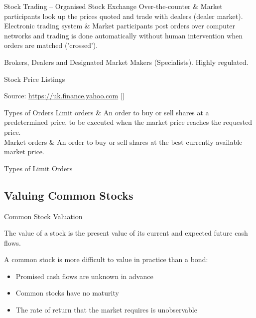 \documentclass[9pt,aspectratio=169]{beamer}
\makeatletter
\newcommand{\keypoint}[1]{%
  \par\noindent
  \begingroup
  \usebeamercolor{keypoint}%
  \setlength{\fboxsep}{7pt}%
  \colorbox{bg}{\parbox{\dimexpr\linewidth-2\fboxsep\relax}{\color{fg}#1}}%
  \endgroup
  \par\medskip}
\newenvironment{terms}{%
  \renewcommand{\arraystretch}{1.35}%
  \tabularx{\linewidth}{@{}>{\bfseries\raggedright\arraybackslash}p{0.30\linewidth} X@{}}
  \toprule}
  {\bottomrule\endtabularx}
\makeatother
\begin{document}
\begin{frame}{Stock Trading – Organised Stock Exchange}
\vspace{0.4em}
\begin{terms}
Over-the-counter & Market participants look up the prices quoted and trade with dealers
  (dealer market). \\
Electronic trading system & Market participants post orders over computer networks and
  trading is done automatically without human intervention when orders are matched
  ('crossed'). \\
\end{terms}

\vspace{0.8em}
Brokers, Dealers and Designated Market Makers (Specialists). Highly regulated.
\end{frame}


\begin{frame}{Stock Price Listings}
\begin{center}


\vspace{0.3cm}
\tiny{Source: \url{https://uk.finance.yahoo.com} [\LHonAsOf]}
\end{center}
\end{frame}


\begin{frame}{Types of Orders}
\vspace{0.5em}
\begin{terms}
Limit orders & An order to buy or sell shares at a predetermined price, to be executed
  when the market price reaches the requested price. \\
Market orders & An order to buy or sell shares at the best currently available market
  price. \\
\end{terms}
\end{frame}


\begin{frame}{Types of Limit Orders}
\begin{center}

\end{center}
\end{frame}

\subsection{Valuing Common Stocks}
\begin{frame}{Common Stock Valuation}
\keypoint{The value of a stock is the present value of its current and expected future
cash flows.}

A common stock is more difficult to value in practice than a bond:
\begin{itemize}
\item Promised cash flows are unknown in advance
\item Common stocks have no maturity
\item The rate of return that the market requires is unobservable
\end{itemize}
\end{frame}
\end{document}
